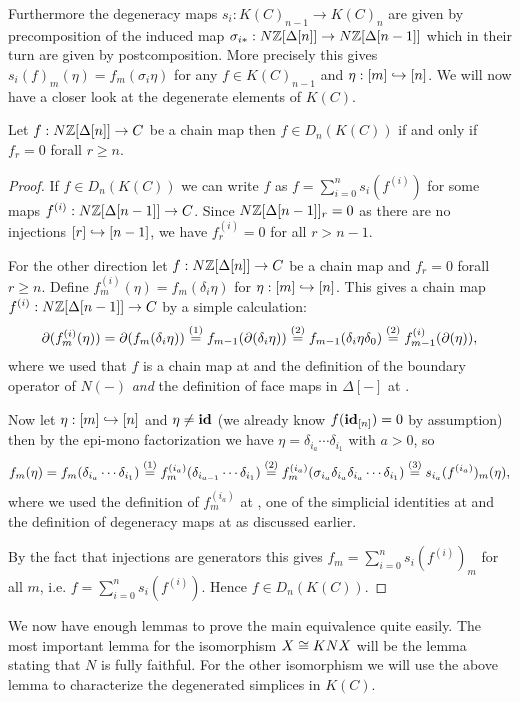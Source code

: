Furthermore the degeneracy maps $s_i: K(C)_{n-1} \to K(C)_n$ are given by precomposition of the induced map $\sigma_{i\ast}: N\mathbb{Z}[\Delta[n]] \to N\mathbb{Z}[\Delta[n-1]]$ which in their turn are given by postcomposition. More precisely this gives $s_i(f)_m(\eta) = f_m(\sigma_i \eta)$ for any $f \in K(C)_{n-1}$ and $\eta: [m] \hookrightarrow [n]$. We will now have a closer look at the degenerate elements of $K(C)$.
\begin{lemma}
	\label{le:degen_k}
	Let $f: N\mathbb{Z}[\Delta[n]] \to C$ be a chain map then $f \in D_n(K(C))$ if and only if $f_r = 0$ forall $r \geq n$.
\end{lemma}
\begin{proof}
	If $f \in D_n(K(C))$ we can write $f$ as $f = \sum_{i=0}^n s_i(f^{(i)})$ for some maps $f^{(i)}: N\mathbb{Z}[\Delta[n-1]] \to C$. Since $N\mathbb{Z}[\Delta[n-1]]_r = 0$ as there are no injections $[r] \hookrightarrow [n-1]$, we have $f^{(i)}_r = 0$ for all $r > n-1$.

	For the other direction let $f: N\mathbb{Z}[\Delta[n]] \to C$ be a chain map and $f_r = 0$ forall $r \geq n$. Define $f_m^{(i)}(\eta) = f_m(\delta_i \eta)$ for $\eta: [m] \hookrightarrow [n]$. This gives a chain map $f^{(i)}: N\mathbb{Z}[\Delta[n-1]] \to C$ by a simple calculation:
	$$ \partial(f_m^{(i)}(\eta)) = \partial(f_m(\delta_i \eta)) \stackrel{(1)}{=} f_{m-1}(\partial(\delta_i \eta)) \stackrel{(2)}{=} f_{m-1}(\delta_i \eta \delta_0) \stackrel{(2)}{=} f_{m-1}^{(i)}(\partial(\eta)), $$
	where we used that $f$ is a chain map at  and the definition of the boundary operator of $N(-)$ \emph{and} the definition of face maps in $\Delta[-]$ at .

	Now let $\eta: [m] \hookrightarrow [n]$ and $\eta \neq \mathbf{id}$ (we already know $f(\mathbf{id}_{[n]})=0$ by assumption) then by the epi-mono factorization we have $\eta = \delta_{i_a} \cdots \delta_{i_1}$ with $a>0$, so
	$$ f_m(\eta) = f_m(\delta_{i_a} \cdots \delta_{i_1}) \stackrel{(1)}{=} f_m^{(i_a)}(\delta_{i_{a-1}} \cdots \delta_{i_1}) \stackrel{(2)}{=} f_m^{(i_a)}(\sigma_{i_a} \delta_{i_a} \delta_{i_a} \cdots \delta_{i_1}) \stackrel{(3)}{=} s_{i_a}(f^{(i_a)})_m(\eta), $$
	where we used the definition of $f_m^{(i_a)}$ at , one of the simplicial identities at  and the definition of degeneracy maps at  as discussed earlier.

	By the fact that injections are generators this gives $f_m = \sum_{i=0}^n s_i(f^{(i)})_m$ for all $m$, i.e. $f = \sum_{i=0}^n s_i(f^{(i)})$. Hence $f \in D_n(K(C))$.
\end{proof}

We now have enough lemmas to prove the main equivalence quite easily. The most important lemma for the isomorphism $X \cong KNX$ will be the lemma stating that $N$ is fully faithful. For the other isomorphism we will use the above lemma to characterize the degenerated simplices in $K(C)$.

